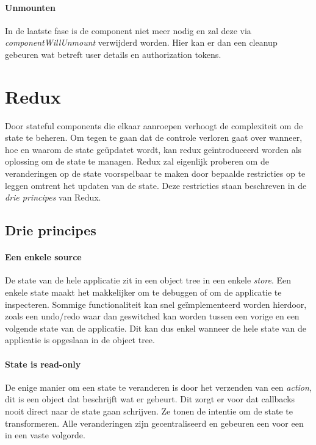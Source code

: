 \paragraph{Unmounten}
In de laatste fase is de component niet meer nodig en zal deze via \textit{componentWillUnmount} verwijderd worden. Hier kan er dan een cleanup gebeuren wat betreft user details en authorization tokens.

\section{Redux}
Door stateful components die elkaar aanroepen verhoogt de complexiteit om de state te beheren. Om tegen te gaan dat de controle verloren gaat over wanneer, hoe en waarom de state geüpdatet wordt, kan redux geïntroduceerd worden als oplossing om de state te managen. Redux zal eigenlijk proberen om de veranderingen op de state voorspelbaar te maken door bepaalde restricties op te leggen omtrent het updaten van de state. Deze restricties staan beschreven in de \textit{drie principes} van Redux.

\subsection{Drie principes}

\paragraph{Een enkele source}  
De state van de hele applicatie zit in een object tree in een enkele \textit{store}. Een enkele state maakt het makkelijker om te debuggen of om de applicatie te inspecteren. Sommige functionaliteit kan snel geïmplementeerd worden hierdoor, zoals een undo/redo waar dan geswitched kan worden tussen een vorige en een volgende state van de applicatie. Dit kan dus enkel wanneer de hele state van de applicatie is opgeslaan in de object tree.

\paragraph{State is read-only}
De enige manier om een state te veranderen is door het verzenden van een \textit{action}, dit is een object dat beschrijft wat er gebeurt. Dit zorgt er voor dat callbacks nooit direct naar de state gaan schrijven. Ze tonen de intentie om de state te transformeren. Alle veranderingen zijn gecentraliseerd en gebeuren een voor een in een vaste volgorde.   

